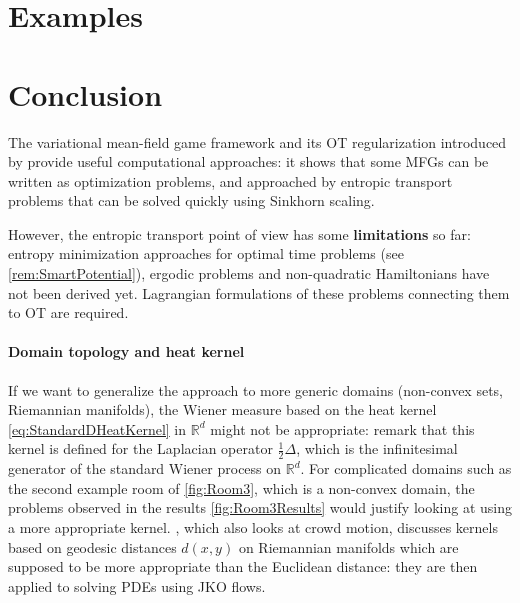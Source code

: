 \documentclass[11pt]{article}
\newcommand{\RR}{\mathbb{R}}
\numberwithin{equation}{section}
\theoremstyle{definition}
\begin{document}




\section{Examples}\label{sec:Examples}




\section{Conclusion}

The variational mean-field game framework and its OT regularization introduced by \textcite{benamou:hal-01295299,benamou2018entropy} provide useful computational approaches: it shows that some MFGs can be written as optimization problems, and approached by entropic transport problems that can be solved quickly using Sinkhorn scaling.

However, the entropic transport point of view has some \textbf{limitations} so far: entropy minimization approaches for optimal time problems (see \cref{rem:SmartPotential}), ergodic problems and non-quadratic Hamiltonians have not been derived yet. Lagrangian formulations of these problems connecting them to OT are required.



\paragraph{Domain topology and heat kernel} If we want to generalize the approach to more generic domains (non-convex sets, Riemannian manifolds), the Wiener measure based on the heat kernel \eqref{eq:StandardDHeatKernel} in $\RR^d$ might not be appropriate: \textcite[p.~5]{benamou2018entropy} remark that this kernel is defined for the Laplacian operator $\frac{1}{2}\Delta$, which is the infinitesimal generator of the standard Wiener process on $\RR^d$.
For complicated domains such as the second example room of \cref{fig:Room3}, which is a non-convex domain, the problems observed in the results \cref{fig:Room3Results} would justify looking at using a more appropriate kernel.
\textcite{peyr2015entropic}, which also looks at crowd motion, discusses kernels based on geodesic distances $d(x,y)$ on Riemannian manifolds which are supposed to be more appropriate than the Euclidean distance: they are then applied to solving PDEs using JKO flows.



\printbibliography{}
\end{document}
